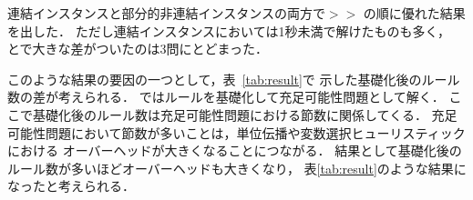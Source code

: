 連結インスタンスと部分的非連結インスタンスの両方で$\gt$$\gt$
の順に優れた結果を出した．
ただし連結インスタンスにおいては1秒未満で解けたものも多く，
とで大きな差がついたのは3問にとどまった．

このような結果の要因の一つとして，表~\ref{tab:result}で
示した基礎化後のルール数の差が考えられる．
{\clingo}ではルールを基礎化して充足可能性問題として解く．
ここで基礎化後のルール数は充足可能性問題における節数に関係してくる．
充足可能性問題において節数が多いことは，単位伝播や変数選択ヒューリスティックにおける
オーバーヘッドが大きくなることにつながる．
結果として基礎化後のルール数が多いほどオーバーヘッドも大きくなり，
表\ref{tab:result}のような結果になったと考えられる．



